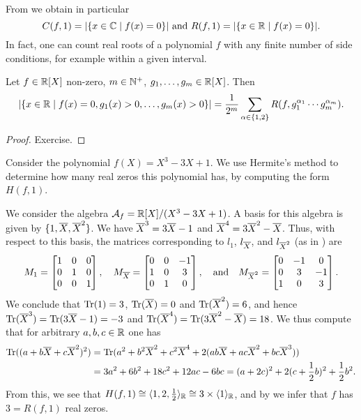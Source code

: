 \documentclass[12pt, leqno, british]{amsart}
\begin{document}
From  we obtain in particular
\begin{displaymath}
C(f, 1) = \lvert \lbrace x \in \mathbb C \mid f(x) = 0 \rbrace\rvert \text{ and } R(f, 1) =  \lvert \lbrace x \in \mathbb R \mid f(x) = 0 \rbrace \rvert.
\end{displaymath}
In fact, one can count real roots of a polynomial $f$ with any finite number of side conditions, for example within a given interval.
\begin{cor}\label{C:Hermite}
Let $f \in \mathbb R[X]$ non-zero, $m \in \mathbb N^+$, $g_1, \ldots, g_m \in \mathbb R[X]$.
Then
$$ \lvert \lbrace x \in \mathbb R \mid f(x) = 0, g_1(x) > 0, \ldots, g_m(x) > 0 \rbrace \rvert = \frac{1}{2^m} \sum_{\alpha \in \lbrace 1, 2 \rbrace} R(f, g_1^{\alpha_1} \cdots g_m^{\alpha_m}). $$
\end{cor}
\begin{proof}
Exercise.
\end{proof}
\begin{eg}
Consider the polynomial $f(X) = X^3 - 3X + 1$. We use Hermite's method to determine how many real zeros this polynomial has, by computing the form $H(f, 1)$.

We consider the algebra $\mathcal{A}_f = \mathbb R[X]/(X^3 - 3X + 1)$.
A basis for this algebra is given by $\lbrace 1, \overline{X}, \overline{X}^2 \rbrace$.
We have $\overline{X}^3 = 3\overline{X} - 1$ and $\overline{X}^4 = 3\overline{X}^2 - \overline{X}$.
Thus, with respect to this basis, the matrices corresponding to $l_1$, $l_{\overline{X}}$, and $l_{\overline{X}^2}$ (as in ) are
\begin{displaymath}
M_1 = \begin{bmatrix}
1 & 0 & 0 \\
0 & 1 & 0 \\
0 & 0 & 1
\end{bmatrix}, \quad M_{\overline{X}} = \begin{bmatrix}
0 & 0 & -1 \\
1 & 0 & 3 \\
0 & 1 & 0
\end{bmatrix}, \quad \text{and} \quad M_{\overline{X}^2} = \begin{bmatrix}
0 & -1 & 0 \\
0 & 3 & -1 \\
1 & 0 & 3
\end{bmatrix}.
\end{displaymath}
We conclude that $\operatorname{Tr}(1) = 3$, $\operatorname{Tr}(\overline{X}) = 0$ and $\operatorname{Tr}(\overline{X}^2) = 6$, and hence $\operatorname{Tr}(\overline{X}^3) = \operatorname{Tr}(3\overline{X} - 1) = -3$ and $\operatorname{Tr}(\overline{X}^4) = \operatorname{Tr}(3\overline{X}^2 - \overline{X}) = 18$.
We thus compute that for arbitrary $a, b, c \in \mathbb R$ one has
\begin{align*}
\operatorname{Tr}((a + b\overline{X} + c\overline{X}^2)^2) &= \operatorname{Tr}(a^2 + b^2\overline{X}^2 + c^2\overline{X}^4 + 2(ab\overline{X} + ac\overline{X}^2 + bc\overline{X}^3)) \\
&= 3a^2 + 6b^2 + 18c^2 + 12ac - 6bc = (a + 2c)^2 + 2(c + \frac{1}{2}b)^2 + \frac{1}{2}b^2.
\end{align*}
From this, we see that $H(f, 1) \cong \langle 1, 2, \frac{1}{2} \rangle_\mathbb R \cong 3 \times \langle 1 \rangle_\mathbb R$, and by  we infer that $f$ has $3 = R(f, 1)$ real zeros.
\end{eg}
\end{document}
